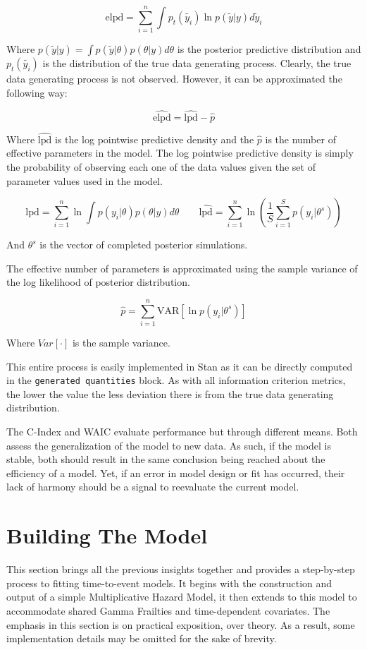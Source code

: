 $$ \text{elpd} = \sum_{i=1}^n \int p_t(\tilde{y_i})\ln p(\tilde{y}|y) d\tilde{y}_i $$

Where $p(\tilde{y}|y) = \int p(\tilde{y}|\theta)p(\theta|y) d\theta$ is the posterior predictive distribution and $p_t(\tilde{y_i})$ is the distribution of the true data generating process. Clearly, the true data generating process is not observed. However, it can be approximated the following way:

$$\hat{\text{elpd}} = \hat{\text{lpd}} - \hat{p}$$

Where $\hat{\text{lpd}}$ is the log pointwise predictive density and the $\hat{p}$ is the number of effective parameters in the model. The log pointwise predictive density is simply the probability of observing each one of the data values given the set of parameter values used in the model.

$$ \text{lpd} = \sum_{i=1}^n \ln \int p(y_i|\theta)p(\theta|y) d\theta \qquad \hat{\text{lpd}} = \sum_{i=1}^n \ln\left ( \frac{1}{S} \sum_{i = 1}^S p(y_i|\theta^s)  \right ) $$

And $\theta^s$ is the vector of completed posterior simulations. 

The effective number of parameters is approximated using the sample variance of the log likelihood of posterior distribution.

$$ \hat{p} = \sum^n_{i=1} \text{VAR}[\ln p(y_i|\theta^s)] $$

Where $Var[\cdot]$ is the sample variance.

This entire process is easily implemented in Stan as it can be directly computed in the \lstinline{generated quantities} block\cite{Vehtari2014}. As with all information criterion metrics, the lower the value the less deviation there is from the true data generating distribution. 

The C-Index and WAIC evaluate performance but through different means. Both assess the generalization of the model to new data. As such, if the model is stable, both should result in the same conclusion being reached about the efficiency of a model. Yet, if an error in model design or fit has occurred, their lack of harmony should be a signal to reevaluate the current model. 




\section*{Building The Model}

This section brings all the previous insights together and provides a step-by-step process to fitting time-to-event models. It begins with the construction and output of a simple Multiplicative Hazard Model, it then extends to this model to accommodate shared Gamma Frailties and time-dependent covariates. The emphasis in this section is on practical exposition, over theory. As a result, some implementation details may be omitted for the sake of brevity. 


